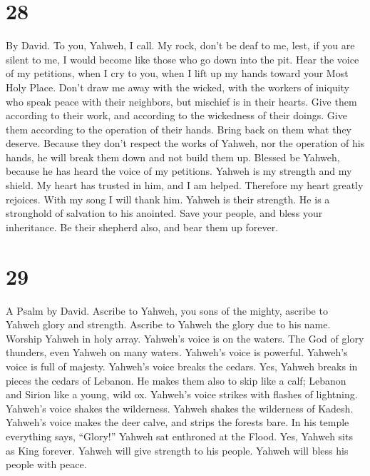 \hypertarget{section-27}{%
\section{28}\label{section-27}}

By David.  To you, Yahweh, I call. My rock, don't be deaf
to me, lest, if you are silent to me, I would become like those who go
down into the pit.  Hear the voice of my petitions, when I
cry to you, when I lift up my hands toward your Most Holy Place.
 Don't draw me away with the wicked, with the workers of
iniquity who speak peace with their neighbors, but mischief is in their
hearts.  Give them according to their work, and according
to the wickedness of their doings. Give them according to the operation
of their hands. Bring back on them what they deserve. 
Because they don't respect the works of Yahweh, nor the operation of his
hands, he will break them down and not build them up. 
Blessed be Yahweh, because he has heard the voice of my petitions.
 Yahweh is my strength and my shield. My heart has trusted
in him, and I am helped. Therefore my heart greatly rejoices. With my
song I will thank him.  Yahweh is their strength. He is a
stronghold of salvation to his anointed.  Save your
people, and bless your inheritance. Be their shepherd also, and bear
them up forever.

\hypertarget{section-28}{%
\section{29}\label{section-28}}

A Psalm by David.  Ascribe to Yahweh, you sons of the
mighty, ascribe to Yahweh glory and strength.  Ascribe to
Yahweh the glory due to his name. Worship Yahweh in holy array.
 Yahweh's voice is on the waters. The God of glory
thunders, even Yahweh on many waters.  Yahweh's voice is
powerful. Yahweh's voice is full of majesty.  Yahweh's
voice breaks the cedars. Yes, Yahweh breaks in pieces the cedars of
Lebanon.  He makes them also to skip like a calf; Lebanon
and Sirion like a young, wild ox.  Yahweh's voice strikes
with flashes of lightning.  Yahweh's voice shakes the
wilderness. Yahweh shakes the wilderness of Kadesh. 
Yahweh's voice makes the deer calve, and strips the forests bare. In his
temple everything says, ``Glory!''  Yahweh sat enthroned
at the Flood. Yes, Yahweh sits as King forever.  Yahweh
will give strength to his people. Yahweh will bless his people with
peace.

